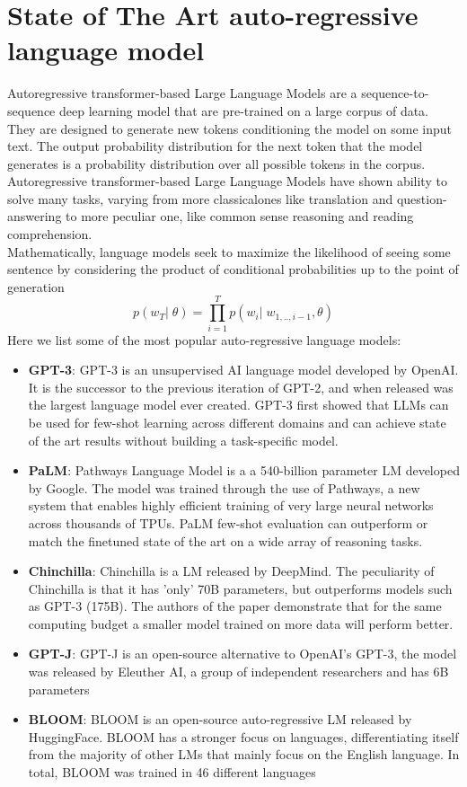 \section{State of The Art auto-regressive language model}
Autoregressive transformer-based Large Language Models are a sequence-to-sequence deep learning model that are pre-trained on a large corpus of data. They are designed to generate new tokens conditioning the model on some input text. The output probability distribution for the next token that the model generates is a probability distribution over all possible tokens in the corpus. \\
Autoregressive transformer-based Large Language Models have shown ability to solve many tasks\cite{gpt3}, varying from more classicalones like translation and question-answering to more peculiar one, like common sense reasoning and reading comprehension. \\
Mathematically, language models seek to maximize the likelihood of seeing some sentence by considering the product of conditional probabilities up to the point of generation
\begin{equation}
    p(w_T|\;\theta) = \prod_{i=1}^{T}p(w_i|\;w_{1,..,i-1}, \theta)
\end{equation}
Here we list some of the most popular auto-regressive language models:
\begin{itemize}
    \item \textbf{GPT-3}: GPT-3\cite{brown2020language} is an unsupervised AI language model developed by OpenAI. It is the successor to the previous iteration of GPT-2, and when released was the largest language model ever created. GPT-3 first showed that LLMs can be used for few-shot learning across different domains and can achieve state of the art results without building a task-specific model.
    \item \textbf{PaLM}: Pathways Language Model\cite{chowdhery2022palm} is a a 540-billion parameter LM developed by Google. The model was trained through the use of Pathways, a new system that enables highly efficient training of very large neural networks across thousands of TPUs. PaLM few-shot evaluation can outperform or match the finetuned state of the art on a wide array of reasoning tasks.
    \item \textbf{Chinchilla}: Chinchilla\cite{hoffmann2022training} is a LM released by DeepMind. The peculiarity of Chinchilla is that it has 'only' 70B parameters, but outperforms models such as GPT-3 (175B). The authors of the paper demonstrate that for the same computing budget a smaller model trained on more data will perform better.
    \item \textbf{GPT-J}: GPT-J\cite{gptj} is an open-source alternative to OpenAI's GPT-3, the model was released by Eleuther AI, a group of independent researchers and has 6B parameters
    \item \textbf{BLOOM}: BLOOM\cite{scao2022bloom} is an open-source auto-regressive LM released by HuggingFace. BLOOM has a stronger focus on languages, differentiating itself from the majority of other LMs that mainly focus on the English language. In total, BLOOM was trained in 46 different languages
\end{itemize}
